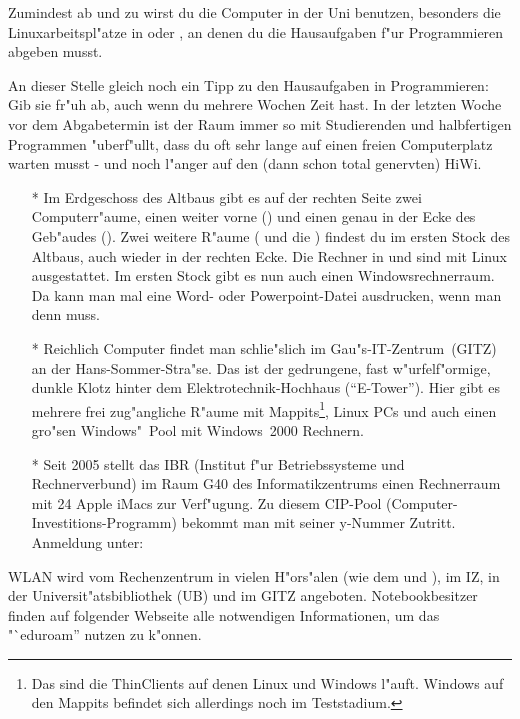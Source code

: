 Zumindest ab und zu wirst du die Computer in der Uni benutzen, besonders
die Linuxarbeitspl"atze in  oder , an denen du die Hausaufgaben f"ur
Programmieren abgeben musst.

{\small
An dieser Stelle gleich noch ein Tipp zu den Hausaufgaben in Programmieren:
Gib sie fr"uh ab, auch wenn du mehrere Wochen Zeit hast. In der letzten Woche
vor dem Abgabetermin ist der Raum immer so mit Studierenden und halbfertigen
Programmen "uberf"ullt, dass du oft sehr lange auf einen freien Computerplatz
warten musst - und noch l"anger auf den (dann schon total genervten) HiWi.
}

\begin{itemize}

\item[*] Im Erdgeschoss des Altbaus gibt es auf der rechten Seite zwei
Computerr"aume, einen weiter vorne () und einen genau in der Ecke
des Geb"audes (). Zwei weitere R"aume ( und die
) findest du im ersten Stock des Altbaus, auch wieder in
der rechten Ecke. Die Rechner in  und  sind mit Linux
ausgestattet. Im ersten Stock gibt es nun auch einen Windowsrechnerraum. Da kann man mal eine Word- oder
Powerpoint-Datei ausdrucken, wenn man denn muss.

\item[*] Reichlich Computer findet man schlie"slich im Gau"s-IT-Zentrum~(GITZ) an der
Hans-Sommer-Stra"se. Das ist der gedrungene, fast w"urfelf"ormige, dunkle
Klotz hinter dem Elektrotechnik-Hochhaus ("`E-Tower"'). Hier gibt es mehrere frei
zug"angliche R"aume mit Mappits\footnote{Das sind die ThinClients auf denen
Linux und Windows l"auft. Windows auf den Mappits befindet sich allerdings noch
im Teststadium.}, Linux PCs und auch einen gro"sen Windows"~Pool mit
Windows~2000 Rechnern.

\item[*] Seit 2005 stellt das IBR (Institut f"ur Betriebssysteme und Rechnerverbund) im Raum G40 des Informatikzentrums einen Rechnerraum mit 24 Apple iMacs zur Verf"ugung. Zu diesem CIP-Pool (Computer-Investitions-Programm) bekommt man mit seiner y-Nummer Zutritt. Anmeldung unter: 

\end{itemize}

WLAN wird vom Rechenzentrum in vielen H"ors"alen (wie dem  und
), im IZ, in der Universit"atsbibliothek (UB) und im GITZ angeboten.
Notebookbesitzer finden auf folgender Webseite alle notwendigen Informationen, um das "`eduroam'' nutzen zu k"onnen.
\par

